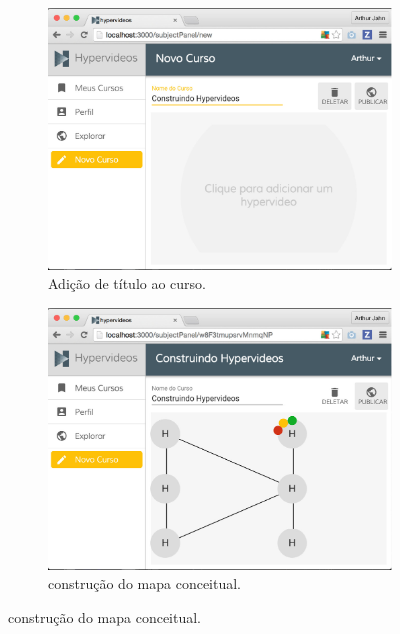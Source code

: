 \begin{figure}[h!]
  	\centering
  	\begin{subfigure}{.5\textwidth}
  		\centering
  		\includegraphics[width=.9\linewidth]{figuras/autoria_conceitual_a.eps}
  		\caption{Adição de título ao curso.}
  		\label{fig:autoria_conceitual_a}
	\end{subfigure}%
	\begin{subfigure}{.5\textwidth}
  		\centering
  		\includegraphics[width=.9\linewidth]{figuras/autoria_conceitual_b.eps}
  		\caption{construção do mapa conceitual.}
  		\label{fig:autoria_conceitual_b}
	\end{subfigure}%
	

\end{figure}
